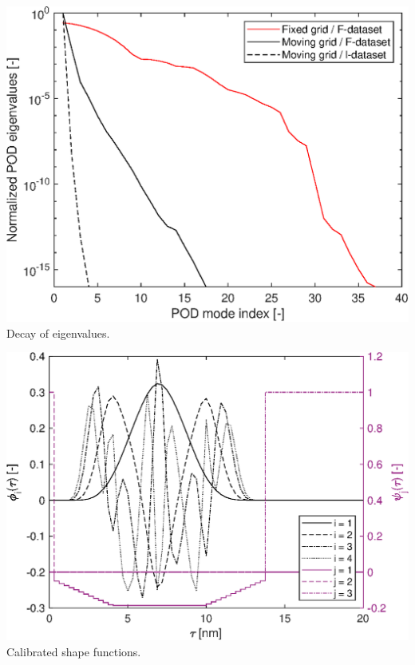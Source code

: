 \documentclass[10pt,xcolor=dvipsnames]{beamer}
\begin{document}
\begin{frame}[t]
  \begin{minipage}[t]{0.49\columnwidth}\vskip0pt\centering\small
  \includegraphics[height=0.75\columnwidth,clip]{fig/plugflow_decay.eps}\\
   Decay of eigenvalues.
  \end{minipage}\hfill
  \begin{minipage}[t]{0.49\columnwidth}\vskip0pt\centering\small
  \includegraphics[height=0.75\columnwidth,clip]{fig/plugflow_II_phi.eps}\\
   Calibrated shape functions.
  \end{minipage}\\




\end{frame}
\end{document}
